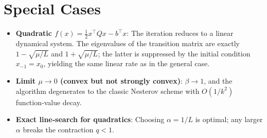 \documentclass{article}
\begin{document}
\section*{Special Cases}
\begin{itemize}
\item \textbf{Quadratic $f(x)=\frac{1}{2}x^{\top}Qx-b^{\top}x$}:  
   The iteration reduces to a linear dynamical system.  The eigenvalues of the transition matrix are exactly $1-\sqrt{\mu/L}$ and $1+\sqrt{\mu/L}$; the latter is suppressed by the initial condition $x_{-1}=x_{0}$, yielding the same linear rate as in the general case.
\item \textbf{Limit $\mu\to0$ (convex but not strongly convex)}:  
   $\beta\to1$, and the algorithm degenerates to the classic Nesterov scheme with $O(1/k^{2})$ function‑value decay.
\item \textbf{Exact line‑search for quadratics}:  
   Choosing $\alpha=1/L$ is optimal; any larger $\alpha$ breaks the contraction $q<1$.
\end{itemize}
\end{document}
